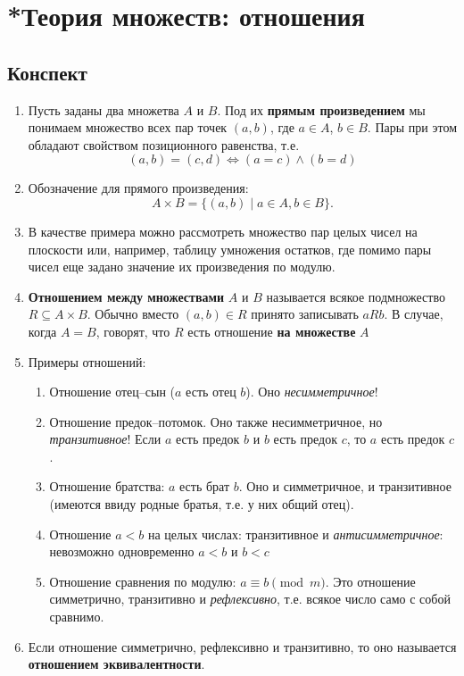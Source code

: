 \section{*Теория множеств: отношения}\label{Rels}



\subsection*{Конспект}
\begin{enumerate}
\item Пусть заданы два множетва $A$ и $B$. Под их \textbf{прямым произведением} мы понимаем множество всех пар точек $(a,b)$, где $a\in A$, $b\in B$. Пары при этом обладают свойством позиционного равенства, т.е.
$$
(a,b)=(c,d) \iff (a=c)\land (b=d)
$$
\item Обозначение для прямого произведения:
$$
A\times B = \{(a,b)\mid a\in A, b\in B\}.
$$
\item В качестве примера можно рассмотреть множество пар целых чисел на плоскости или, например, таблицу умножения остатков, где помимо пары чисел еще задано значение их произведения по модулю.
\item \textbf{Отношением между множествами} $A$ и $B$ называется всякое подмножество $R\subseteq A\times B$. Обычно вместо $(a,b)\in R$ принято записывать $aRb$. В случае, когда $A=B$, говорят, что $R$ есть отношение \textbf{на множестве} $A$
\item Примеры отношений:
\begin{enumerate}[R1]
\item Отношение отец--сын ($a$ есть отец $b$). Оно \textit{несимметричное}!
\item Отношение предок--потомок. Оно также несимметричное, но \textit{транзитивное}! Если $a$ есть предок $b$ и $b$ есть предок $c$, то $a$ есть предок $c$.
\item Отношение братства: $a$ есть брат $b$. Оно и симметричное, и транзитивное (имеются ввиду родные братья, т.е. у них общий отец).
\item Отношение $a<b$ на целых числах: транзитивное и \textit{антисимметричное}: невозможно одновременно $a<b$ и $b<c$
\item Отношение сравнения по модулю: $a\equiv b\pmod m$. Это отношение симметрично, транзитивно и \textit{рефлексивно}, т.е. всякое число само с собой сравнимо.
\end{enumerate}
\item Если отношение симметрично, рефлексивно и транзитивно, то оно называется \textbf{отношением эквивалентности}.

\end{enumerate}
